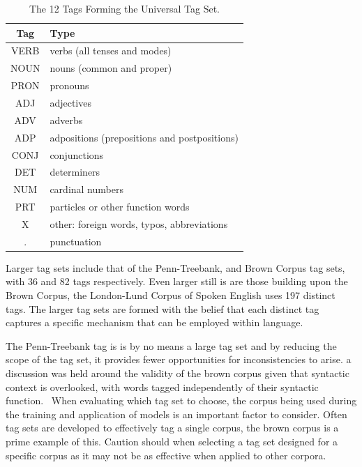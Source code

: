\documentclass[10pt]{report}
\begin{document}
\renewcommand{\baselinestretch}{1.0}\normalsize
\renewcommand{\arraystretch}{1.0}
\begin{table}[h!]
  \centering
  \begin{tabular}{c | l}
    Tag & Type \\
    \hline
VERB & verbs (all tenses and modes)\\
NOUN & nouns (common and proper)\\
PRON & pronouns \\
ADJ & adjectives\\
ADV & adverbs\\
ADP & adpositions (prepositions and postpositions)\\
CONJ & conjunctions\\
DET & determiners\\
NUM & cardinal numbers\\
PRT & particles or other function words\\
X & other: foreign words, typos, abbreviations\\
. & punctuation\\
  \end{tabular}
  \caption{The 12 Tags Forming the Universal Tag Set.\label{tab:universal_tags}}
\end{table}
\renewcommand{\baselinestretch}{2.0}\normalsize
\renewcommand{\arraystretch}{1.0}

Larger tag sets include that of the Penn-Treebank, and Brown Corpus tag sets, with 36 and 82 tags respectively. Even larger still is are those building upon the Brown Corpus, the London-Lund Corpus
of Spoken English uses 197 distinct tags. The larger tag sets are formed with the belief that each distinct tag captures a specific mechanism that can be employed within language. ~\cite{garside1988computational}

The Penn-Treebank tag is is by no means a large tag set and by reducing the scope of the tag set, it provides fewer opportunities for inconsistencies to arise. a discussion was held around the validity of the brown corpus given that syntactic context is overlooked, with words tagged independently of their syntactic function.~\cite{Marcus1993-tw} When evaluating which tag set to choose, the corpus being used during the training and application of models is an important factor to consider. Often tag sets are developed to effectively tag a single corpus, the brown corpus is a prime example of this. Caution should when selecting a tag set designed for a specific corpus as it may not be as effective when applied to other corpora.
\end{document}
